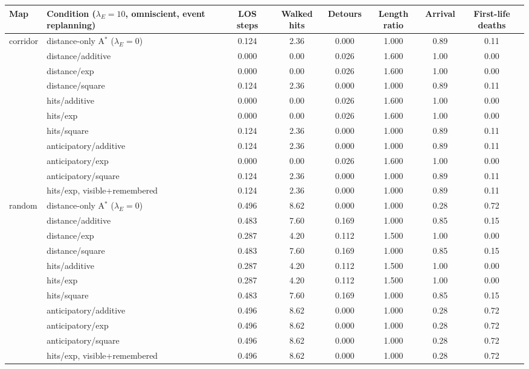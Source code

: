 \begin{tabular}{llcccccc}
\toprule
Map & Condition ($\lambda_E=10$, omniscient, event replanning) & LOS steps & Walked hits & Detours & Length ratio & Arrival & First-life deaths \\
\midrule
corridor & distance-only A$^*$ ($\lambda_E=0$) & 0.124 & 2.36 & 0.000 & 1.000 & 0.89 & 0.11 \\
 & distance/additive & 0.000 & 0.00 & 0.026 & 1.600 & 1.00 & 0.00 \\
 & distance/exp & 0.000 & 0.00 & 0.026 & 1.600 & 1.00 & 0.00 \\
 & distance/square & 0.124 & 2.36 & 0.000 & 1.000 & 0.89 & 0.11 \\
 & hits/additive & 0.000 & 0.00 & 0.026 & 1.600 & 1.00 & 0.00 \\
 & hits/exp & 0.000 & 0.00 & 0.026 & 1.600 & 1.00 & 0.00 \\
 & hits/square & 0.124 & 2.36 & 0.000 & 1.000 & 0.89 & 0.11 \\
 & anticipatory/additive & 0.124 & 2.36 & 0.000 & 1.000 & 0.89 & 0.11 \\
 & anticipatory/exp & 0.000 & 0.00 & 0.026 & 1.600 & 1.00 & 0.00 \\
 & anticipatory/square & 0.124 & 2.36 & 0.000 & 1.000 & 0.89 & 0.11 \\
 & hits/exp, visible+remembered & 0.124 & 2.36 & 0.000 & 1.000 & 0.89 & 0.11 \\
random & distance-only A$^*$ ($\lambda_E=0$) & 0.496 & 8.62 & 0.000 & 1.000 & 0.28 & 0.72 \\
 & distance/additive & 0.483 & 7.60 & 0.169 & 1.000 & 0.85 & 0.15 \\
 & distance/exp & 0.287 & 4.20 & 0.112 & 1.500 & 1.00 & 0.00 \\
 & distance/square & 0.483 & 7.60 & 0.169 & 1.000 & 0.85 & 0.15 \\
 & hits/additive & 0.287 & 4.20 & 0.112 & 1.500 & 1.00 & 0.00 \\
 & hits/exp & 0.287 & 4.20 & 0.112 & 1.500 & 1.00 & 0.00 \\
 & hits/square & 0.483 & 7.60 & 0.169 & 1.000 & 0.85 & 0.15 \\
 & anticipatory/additive & 0.496 & 8.62 & 0.000 & 1.000 & 0.28 & 0.72 \\
 & anticipatory/exp & 0.496 & 8.62 & 0.000 & 1.000 & 0.28 & 0.72 \\
 & anticipatory/square & 0.496 & 8.62 & 0.000 & 1.000 & 0.28 & 0.72 \\
 & hits/exp, visible+remembered & 0.496 & 8.62 & 0.000 & 1.000 & 0.28 & 0.72 \\

\end{tabular}
